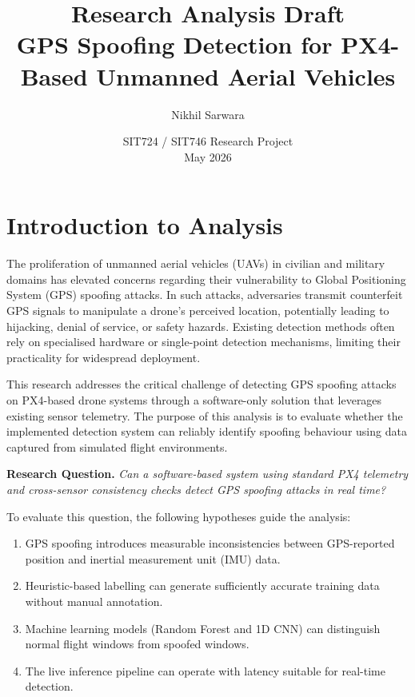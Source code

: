 \documentclass[11pt,a4paper]{article}
\title{\textbf{Research Analysis Draft}\\[0.5em]
\large GPS Spoofing Detection for PX4-Based Unmanned Aerial Vehicles}
\author{Nikhil Sarwara}
\date{SIT724 / SIT746 Research Project\\May 2026}
\begin{document}
\maketitle

\section{Introduction to Analysis}

The proliferation of unmanned aerial vehicles (UAVs) in civilian and military domains has elevated concerns regarding their vulnerability to Global Positioning System (GPS) spoofing attacks. In such attacks, adversaries transmit counterfeit GPS signals to manipulate a drone's perceived location, potentially leading to hijacking, denial of service, or safety hazards. Existing detection methods often rely on specialised hardware or single-point detection mechanisms, limiting their practicality for widespread deployment.

This research addresses the critical challenge of detecting GPS spoofing attacks on PX4-based drone systems through a software-only solution that leverages existing sensor telemetry. The purpose of this analysis is to evaluate whether the implemented detection system can reliably identify spoofing behaviour using data captured from simulated flight environments.

\textbf{Research Question.} \textit{Can a software-based system using standard PX4 telemetry and cross-sensor consistency checks detect GPS spoofing attacks in real time?}

To evaluate this question, the following hypotheses guide the analysis:
\begin{enumerate}[label=H\arabic*:,leftmargin=2em]
    \item GPS spoofing introduces measurable inconsistencies between GPS-reported position and inertial measurement unit (IMU) data.
    \item Heuristic-based labelling can generate sufficiently accurate training data without manual annotation.
    \item Machine learning models (Random Forest and 1D CNN) can distinguish normal flight windows from spoofed windows.
    \item The live inference pipeline can operate with latency suitable for real-time detection.
\end{enumerate}
\end{document}
